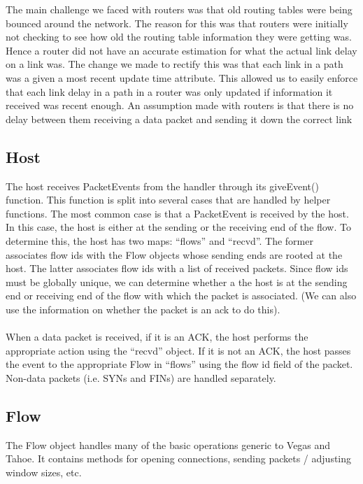\documentclass[12pt]{article}
\begin{document}
The main challenge we faced with routers was that old routing tables were being bounced around the network. The reason for this was that routers were initially not checking to see how old the routing table information they were getting was. Hence a router did not have an accurate estimation for what the actual link delay on a link was. The change we made to rectify this was that each link in a path was a given a most recent update time attribute. This allowed us to easily enforce that each link delay in a path in a router was only updated if information it received was recent enough. An assumption made with routers is that there is no delay between them receiving a data packet and sending it down the correct link



\subsection{Host}
The host receives PacketEvents from the handler through its giveEvent() function.  This function is split into several cases that are handled by helper functions.  The most common case is that a PacketEvent is received by the host.  In this case, the host is either at the sending or the receiving end of the flow.  To determine this, the host has two maps: ``flows'' and ``recvd''.  The former associates flow ids with the Flow objects whose sending ends are rooted at the host.  The latter associates flow ids with a list of received packets.  Since flow ids must be globally unique, we can determine whether a the host is at the sending end or receiving end of the flow with which the packet is associated.  (We can also use the information on whether the packet is an ack to do this).
\\\\
When a data packet is received, if it is an ACK, the host performs the appropriate action using the ``recvd'' object.  If it is not an ACK, the host passes the event to the appropriate Flow in ``flows'' using the flow id field of the packet.  Non-data packets (i.e. SYNs and FINs) are handled separately.

\subsection{Flow}
The Flow object handles many of the basic operations generic to Vegas and Tahoe.  It contains methods for opening connections, sending packets / adjusting window sizes, etc.
\end{document}
